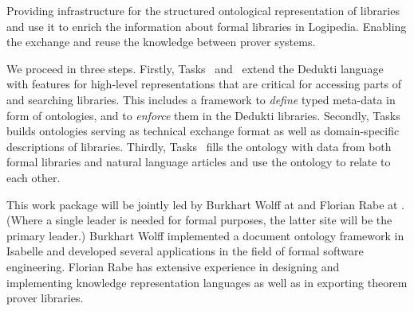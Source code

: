\begin{workpackage}[id=structuring,type=RTD,wphases=1-48,
  short={Structure of the encyclopedia},%
  title={Structure of the encyclopedia},
  activity=tna,
  lead=Fau,
  SacRM=40,
  FauRM=25,
  BolRM=5,
  TouRM=8
]



\begin{wpobjectives}
Providing infrastructure for the structured ontological representation
of libraries and use it to enrich the information about formal
libraries in Logipedia.  Enabling the exchange and reuse the knowledge
between prover systems.
\end{wpobjectives}


\begin{wpdescription}
We proceed in three steps.
Firstly, Tasks~ and~ extend the Dedukti language with features for high-level representations that are critical for accessing parts of and searching libraries.
This includes a framework to \emph{define} typed meta-data in form of ontologies, and to \emph{enforce} them in 
the Dedukti libraries.
Secondly, Tasks~ builds ontologies serving as technical exchange format as well as domain-specific descriptions of libraries.
Thirdly, Tasks~ fills the ontology with data from both formal libraries and natural language articles and use the ontology to relate to each other.

This work package will be jointly led by Burkhart Wolff at  and Florian Rabe at .
(Where a single leader is needed for formal purposes, the latter site will be the primary leader.)
Burkhart Wolff implemented a document ontology framework in Isabelle and developed several applications
in the field of formal software engineering.
Florian Rabe has extensive experience in designing and implementing knowledge representation languages
as well as in exporting theorem prover libraries.
\end{wpdescription}


\end{workpackage}

